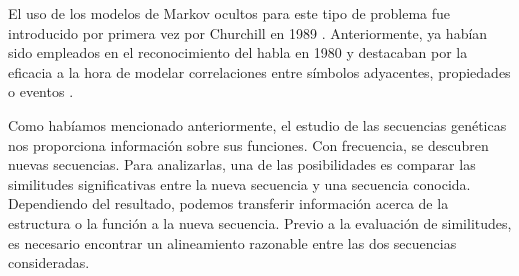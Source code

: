 El uso de los modelos de Markov ocultos para este tipo de problema fue introducido por primera vez por Churchill en 1989 \cite{Churchill}. Anteriormente, ya habían sido empleados en el reconocimiento del habla en 1980 \cite{Ferguson} y destacaban por la eficacia a la hora de modelar correlaciones entre símbolos adyacentes, propiedades o eventos \cite{Rabiner}. 

Como habíamos mencionado anteriormente, el estudio de las secuencias genéticas nos proporciona información sobre sus funciones. Con frecuencia, se descubren nuevas secuencias. Para analizarlas, una de las posibilidades es comparar las similitudes significativas entre la nueva secuencia y una secuencia conocida. Dependiendo del resultado, podemos transferir información acerca de la estructura o la función a la nueva secuencia. Previo a la evaluación de similitudes, es necesario encontrar un alineamiento razonable entre las dos secuencias consideradas. 